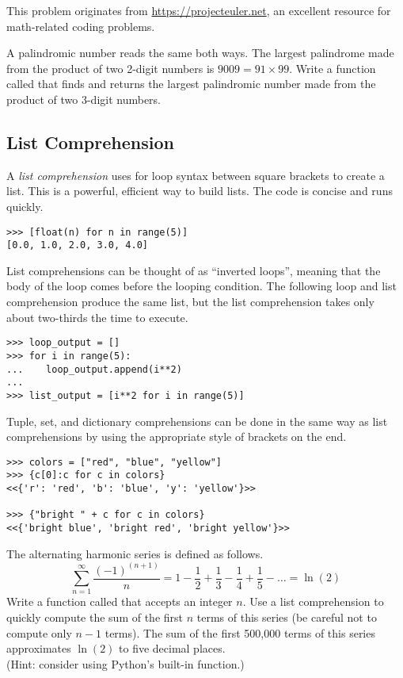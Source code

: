 \begin{problem} %
This problem originates from \url{https://projecteuler.net}, an excellent resource for math-related coding problems.

A palindromic number reads the same both ways.
The largest palindrome made from the product of two 2-digit numbers is $9009 = 91 \times 99.$
Write a function called  that finds and returns the largest palindromic number made from the product of two 3-digit numbers.
\end{problem}

\subsection*{List Comprehension} %

A \emph{list comprehension} uses for loop syntax between square brackets to create a list.
This is a powerful, efficient way to build lists.
The code is concise and runs quickly.

\begin{lstlisting}
>>> [float(n) for n in range(5)]
[0.0, 1.0, 2.0, 3.0, 4.0]
\end{lstlisting}

List comprehensions can be thought of as ``inverted loops'', meaning that the body of the loop comes before the looping condition.
The following loop and list comprehension produce the same list, but the list comprehension takes only about two-thirds the time to execute.

\begin{lstlisting}
>>> loop_output = []
>>> for i in range(5):
...    loop_output.append(i**2)
...
>>> list_output = [i**2 for i in range(5)]
\end{lstlisting}

Tuple, set, and dictionary comprehensions can be done in the same way as list comprehensions by using the appropriate style of brackets on the end.

\begin{lstlisting}
>>> colors = ["red", "blue", "yellow"]
>>> {c[0]:c for c in colors}
<<{'r': 'red', 'b': 'blue', 'y': 'yellow'}>>

>>> {"bright " + c for c in colors}
<<{'bright blue', 'bright red', 'bright yellow'}>>
\end{lstlisting}

\begin{problem} %
The alternating harmonic series is defined as follows.
\[\sum_{n=1}^\infty \frac{(-1)^{(n+1)}}{n} = 1 - \frac{1}{2} + \frac{1}{3} - \frac{1}{4} + \frac{1}{5} - \ldots = \ln(2)\]
Write a function called  that accepts an integer $n$.
Use a list comprehension to quickly compute the sum of the first $n$ terms of this series (be careful not to compute only $n-1$ terms).
The sum of the first 500,000 terms of this series approximates $\ln(2)$ to five decimal places.
\\(Hint: consider using Python's built-in  function.)
\end{problem}

